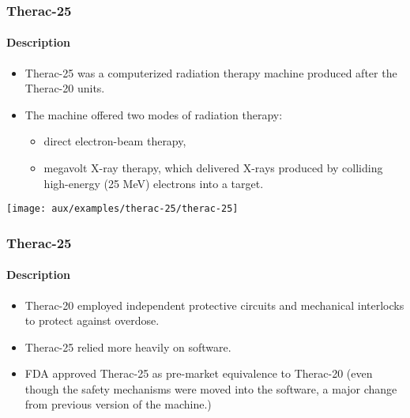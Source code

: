 \begin{frame}[hasprev=false, hasnext=true]
\label{example:therac-25}
\frametitle{Therac-25}
\framesubtitle{Description}

\begin{itemize}
	\item Therac-25 was a computerized radiation therapy machine produced
	after the Therac-20 units.

	\item The machine offered two modes of radiation therapy:
	\begin{itemize}
		\item direct electron-beam therapy,

		\item megavolt X-ray therapy, which delivered X-rays produced by
		colliding high-energy (25 MeV) electrons into a target.
	\end{itemize}
\end{itemize}

\begin{block:ie}{}
	\centering
	\texttt{[image: aux/examples/therac-25/therac-25]}
\end{block:ie}
\end{frame}



\begin{frame}[hasprev=true, hasnext=true]
\frametitle{Therac-25}
\framesubtitle{Description}

\begin{itemize}
	\item Therac-20 employed independent protective circuits and mechanical
	interlocks to protect against overdose.

	\item Therac-25 relied more heavily on software.

	\item FDA approved Therac-25 as pre-market equivalence to Therac-20
	(even though the safety mechanisms were moved into the software, a
	major change from previous version of the machine.)
\end{itemize}
\end{frame}


